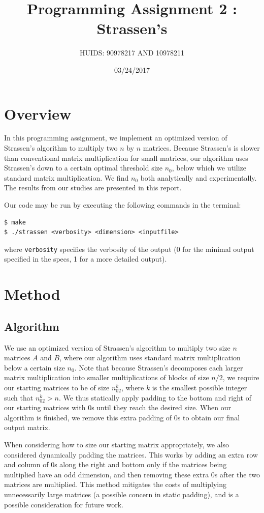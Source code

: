 \documentclass[a4paper]{article}
\title{Programming Assignment 2 : Strassen's}
\author{HUIDS: 90978217 AND 10978211}
\date{03/24/2017}
\begin{document}
\maketitle

\section{Overview}
In this programming assignment, we implement an optimized version of Strassen's algorithm to multiply two $n$ by $n$ matrices. Because Strassen's is slower than conventional matrix multiplication for small matrices, our algorithm uses Strassen's down to a certain optimal threshold size $n_0$, below which we utilize standard matrix multiplication. We find $n_0$ both analytically and experimentally. The results from our studies are presented in this report.

Our code may be run by executing the following commands in the terminal:
\begin{verbatim}
$ make
$ ./strassen <verbosity> <dimension> <inputfile>
\end{verbatim}
where \texttt{verbosity} specifies the verbosity of the output (0 for the minimal output specified in the specs, 1 for a more detailed output).

\section{Method}
\subsection{Algorithm}
We use an optimized version of Strassen's algorithm to multiply two size $n$ matrices $A$ and $B$, where our algorithm uses standard matrix multiplication below a certain size $n_0$. Note that because Strassen's decomposes each larger matrix multiplication into smaller multiplications of blocks of size $n/2$, we require our starting matrices to be of size $n_02^k$, where $k$ is the smallest possible integer such that $n_02^k > n$. We thus statically apply padding to the bottom and right of our starting matrices with 0s until they reach the desired size. When our algorithm is finished, we remove this extra padding of 0s to obtain our final output matrix.

When considering how to size our starting matrix appropriately, we also considered dynamically padding the matrices. This works by adding an extra row and column of 0s along the right and bottom only if the matrices being multiplied have an odd dimension, and then removing these extra 0s after the two matrices are multiplied. This method mitigates the costs of multiplying unnecessarily large matrices (a possible concern in static padding), and is a possible consideration for future work.
\end{document}
